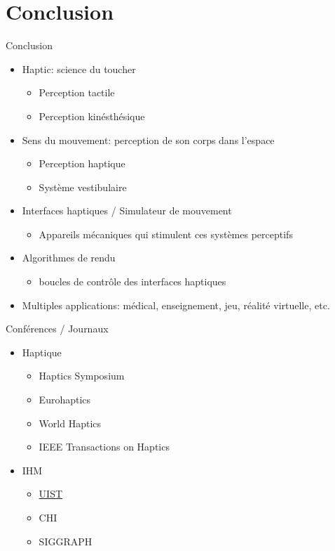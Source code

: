 \documentclass[compress, noflama]{beamer}
\begin{document}
\section{Conclusion} 
\begin{frame}{Conclusion}
	\begin{itemize}
		\item Haptic: science du toucher
		\begin{itemize}
		\item Perception tactile
		\item Perception kinésthésique
		\end{itemize}
		\item Sens du mouvement: perception de son corps dans l'espace
		\begin{itemize}
		\item Perception haptique
		\item Système vestibulaire
		\end{itemize}
		\item Interfaces haptiques / Simulateur de mouvement
		\begin{itemize}
		\item Appareils mécaniques qui stimulent ces systèmes perceptifs
\end{itemize}
		\item Algorithmes de rendu
		\begin{itemize}
		\item boucles de contrôle des interfaces haptiques
		\end{itemize}
		\item Multiples applications: médical, enseignement, jeu, réalité virtuelle, etc.
	\end{itemize}
\end{frame}	 


\begin{frame}{Conférences / Journaux}
	\begin{itemize}
	\item Haptique
	\begin{itemize}
	\item Haptics Symposium
	\item Eurohaptics
	\item World Haptics
	\item IEEE Transactions on Haptics
	\end{itemize}
	\item IHM
	\begin{itemize}
	\item \href{https://www.youtube.com/user/acmsigchi}{UIST}
	\item CHI
	\item SIGGRAPH
	\end{itemize}
	\end{itemize}

\end{frame}
\end{document}
